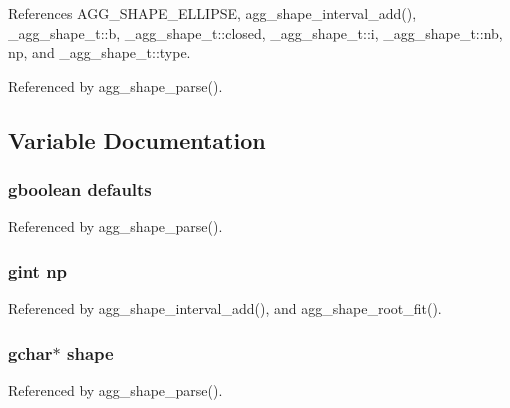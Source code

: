 References A\+G\+G\+\_\+\+S\+H\+A\+P\+E\+\_\+\+E\+L\+L\+I\+P\+S\+E, agg\+\_\+shape\+\_\+interval\+\_\+add(), \+\_\+agg\+\_\+shape\+\_\+t\+::b, \+\_\+agg\+\_\+shape\+\_\+t\+::closed, \+\_\+agg\+\_\+shape\+\_\+t\+::i, \+\_\+agg\+\_\+shape\+\_\+t\+::nb, np, and \+\_\+agg\+\_\+shape\+\_\+t\+::type.



Referenced by agg\+\_\+shape\+\_\+parse().



\subsection{Variable Documentation}
\subsubsection[{defaults}]{\setlength{\rightskip}{0pt plus 5cm}gboolean defaults}\label{shape_8c_ac27827e475de3a05366670bec9746498}


Referenced by agg\+\_\+shape\+\_\+parse().

\subsubsection[{np}]{\setlength{\rightskip}{0pt plus 5cm}gint np}\label{shape_8c_a96ca1086cda152ba0935e179cda8d77a}


Referenced by agg\+\_\+shape\+\_\+interval\+\_\+add(), and agg\+\_\+shape\+\_\+root\+\_\+fit().

\subsubsection[{shape}]{\setlength{\rightskip}{0pt plus 5cm}gchar$\ast$ shape}\label{shape_8c_a72f6aee7a64c9c9c03ddc5751f21d6e2}


Referenced by agg\+\_\+shape\+\_\+parse().

